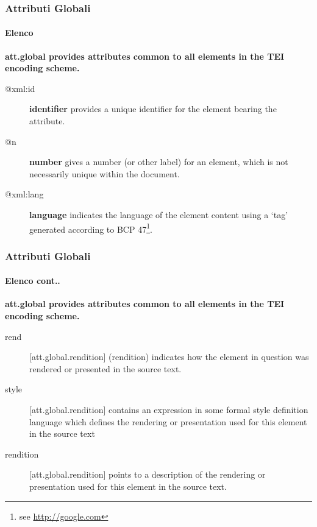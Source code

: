 \begin{frame}
    \frametitle{Attributi Globali}
    \framesubtitle{Elenco}
    \addtocounter{nframe}{1}


\textbf{\textrm{att.global} provides attributes common to all elements in the TEI encoding scheme.}

\begin{description}
    \item [@xml:id]     \textbf{identifier} provides a unique identifier for the element bearing the attribute.
    \item [@n]          \textbf{number} gives a number (or other label) for an element, which is not necessarily unique within the document.
    \item [@xml:lang]   \textbf{language} indicates the language of the element content using a ‘tag’ generated according to BCP 47\footnote{see \href{http://google.con}{http://google.com}}.
\end{description}

\end{frame}


\begin{frame}
    \frametitle{Attributi Globali}
    \framesubtitle{Elenco cont..}
    \addtocounter{nframe}{1}


\textbf{\textmd{att.global} provides attributes common to all elements in the TEI encoding scheme.}

\begin{description}
    \item [rend] [att.global.rendition]	(rendition) indicates how the element in question was rendered or presented in the source text.
    \item [style] [att.global.rendition]	contains an expression in some formal style definition language which defines the rendering or presentation used for this element in the source text
    \item [rendition] [att.global.rendition]	points to a description of the rendering or presentation used for this element in the source text.
\end{description}

\end{frame}

